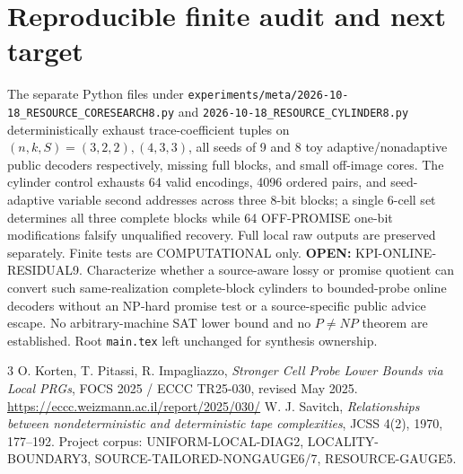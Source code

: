 \documentclass[11pt]{article}
\begin{document}
\section{Reproducible finite audit and next target}
The separate Python files under \texttt{experiments/meta/2026-10-18\_RESOURCE\_CORESEARCH8.py} and \texttt{2026-10-18\_RESOURCE\_CYLINDER8.py} deterministically exhaust trace-coefficient tuples on $(n,k,S)=(3,2,2),(4,3,3)$, all seeds of 9 and 8 toy adaptive/nonadaptive public decoders respectively, missing full blocks, and small off-image cores. The cylinder control exhausts 64 valid encodings, 4096 ordered pairs, and seed-adaptive variable second addresses across three 8-bit blocks; a single 6-cell set determines all three complete blocks while 64 OFF-PROMISE one-bit modifications falsify unqualified recovery. Full local raw outputs are preserved separately. Finite tests are COMPUTATIONAL only.
\noindent \textbf{OPEN:} KPI-ONLINE-RESIDUAL9. Characterize whether a source-aware lossy or promise quotient can convert such same-realization complete-block cylinders to bounded-probe online decoders without an NP-hard promise test or a source-specific public advice escape. No arbitrary-machine SAT lower bound and no $P\ne NP$ theorem are established. Root \texttt{main.tex} left unchanged for synthesis ownership.
\begin{thebibliography}{3}
 O. Korten, T. Pitassi, R. Impagliazzo, \emph{Stronger Cell Probe Lower Bounds via Local PRGs}, FOCS 2025 / ECCC TR25-030, revised May 2025. \url{https://eccc.weizmann.ac.il/report/2025/030/}
 W. J. Savitch, \emph{Relationships between nondeterministic and deterministic tape complexities}, JCSS 4(2), 1970, 177--192.
 Project corpus: UNIFORM-LOCAL-DIAG2, LOCALITY-BOUNDARY3, SOURCE-TAILORED-NONGAUGE6/7, RESOURCE-GAUGE5.
\end{thebibliography}
\end{document}
